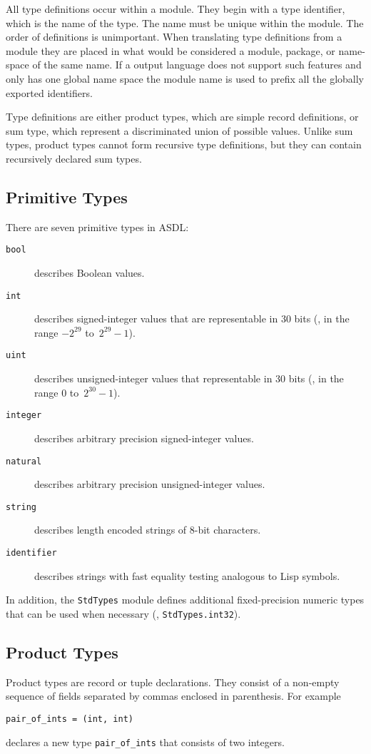 All type definitions occur within a module.  They begin with a type
identifier, which is the name of the type. The name must be unique within the
module. The order of definitions is unimportant. When translating type
definitions from a module they are placed in what would be considered a
module, package, or name-space of the same name. If a output language does
not support such features and only has one global name space the module name
is used to prefix all the globally exported identifiers.

Type definitions are either product types, which are simple record definitions,
or sum type, which represent a discriminated union of possible values. Unlike
sum types, product types cannot form recursive type definitions, but they can
contain recursively declared sum types.

\subsection{Primitive Types}
There are seven primitive types in ASDL:
\begin{description}
  \item[\normalfont\texttt{\color{\cdColor}bool}] describes Boolean values.
  \item[\normalfont\texttt{\color{\cdColor}int}] describes signed-integer values that are representable in 30 bits
    (\ie{}, in the range ${-}2^{29}$ to~\mbox{$2^{29}-1$}).
  \item[\normalfont\texttt{\color{\cdColor}uint}] describes unsigned-integer values that representable in 30 bits
    (\ie{}, in the range $0$ to~$2^{30}-1$).
  \item[\normalfont\texttt{\color{\cdColor}integer}] describes arbitrary precision signed-integer values.
  \item[\normalfont\texttt{\color{\cdColor}natural}] describes arbitrary precision unsigned-integer values.
  \item[\normalfont\texttt{\color{\cdColor}string}] describes length encoded strings of 8-bit characters.
  \item[\normalfont\texttt{\color{\cdColor}identifier}] describes strings with fast equality testing
    analogous to Lisp symbols.
\end{description}%

In addition, the \lstinline!StdTypes! module defines additional fixed-precision numeric types
that can be used when necessary (\eg{}, \lstinline!StdTypes.int32!).

\subsection{Product Types}
Product types are record or tuple declarations. They consist of a non-empty 
sequence of fields separated by commas enclosed in parenthesis. For
example 
\begin{code}\begin{lstlisting}[language=ASDL] 
pair_of_ints = (int, int) 
\end{lstlisting}\end{code}%
declares a new type \lstinline[language=ASDL]!pair_of_ints! that consists of two integers.

